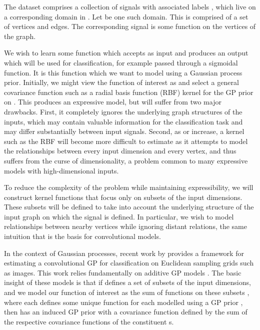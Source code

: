 \documentclass{article}
\begin{document}
The dataset  comprises a collection of signals  with associated labels , which live on a corresponding domain in . Let  be one such domain. This  is comprised of a set of  vertices and  edges. The corresponding signal  is some function  on the vertices of the graph.

We wish to learn some function  which accepts  as input and produces an output which will be used for classification, for example passed through a sigmoidal function. It is this function  which we want to model using a Gaussian process prior. Initially, we might view the function of interest as  and select a general covariance function such as a radial basis function (RBF) kernel for the GP prior on . This produces an expressive model, but will suffer from two major drawbacks. First, it completely ignores the underlying graph structures of the inputs, which may contain valuable information for the classification task and may differ substantially between input signals. Second, as  or  increase, a kernel such as the RBF will become more difficult to estimate as it attempts to model the relationships between every input dimension and every vertex, and thus suffers from the curse of dimensionality, a problem common to many expressive models with high-dimensional inputs.

To reduce the complexity of the problem while maintaining expressibility, we will construct kernel functions that focus only on subsets of the input dimensions. These subsets will be defined to take into account the underlying structure of the input graph on which the signal is defined. In particular, we wish to model relationships between nearby vertices while ignoring distant relations, the same intuition that is the basis for convolutional models.

In the context of Gaussian processes, recent work by \citet{convgp} provides a framework for estimating a convolutional GP for classification on Euclidean sampling grids such as images. This work relies fundamentally on additive GP models \citep{duvenaud2011additive11}. The basic insight of these models is that if  defines a set of subsets of the input dimensions, and we model our function of interest as the sum of functions on these subsets , where each  defines some unique function for each  modelled using a GP prior , then  has an induced GP prior with a covariance function defined by the sum of the respective covariance functions of the constituent s.
\end{document}
